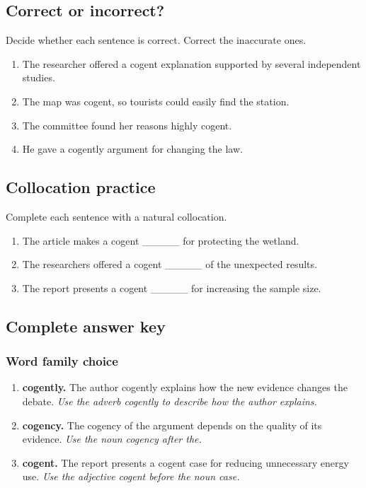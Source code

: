 \documentclass[11pt]{article}
\begin{document}
\subsection{Correct or incorrect?}
Decide whether each sentence is correct. Correct the inaccurate ones.

\begin{enumerate}
  \item The researcher offered a cogent explanation supported by several independent studies.
  \item The map was cogent, so tourists could easily find the station.
  \item The committee found her reasons highly cogent.
  \item He gave a cogently argument for changing the law.
\end{enumerate}

\subsection{Collocation practice}
Complete each sentence with a natural collocation.

\begin{enumerate}
  \item The article makes a cogent \_\_\_\_\_ for protecting the wetland.
  \item The researchers offered a cogent \_\_\_\_\_ of the unexpected results.
  \item The report presents a cogent \_\_\_\_\_ for increasing the sample size.
\end{enumerate}

\subsection{Complete answer key}
\subsubsection{Word family choice}
\begin{enumerate}
  \item \textbf{cogently.} The author cogently explains how the new evidence changes the debate. \emph{Use the adverb cogently to describe how the author explains.}
  \item \textbf{cogency.} The cogency of the argument depends on the quality of its evidence. \emph{Use the noun cogency after the.}
  \item \textbf{cogent.} The report presents a cogent case for reducing unnecessary energy use. \emph{Use the adjective cogent before the noun case.}
\end{enumerate}
\end{document}
